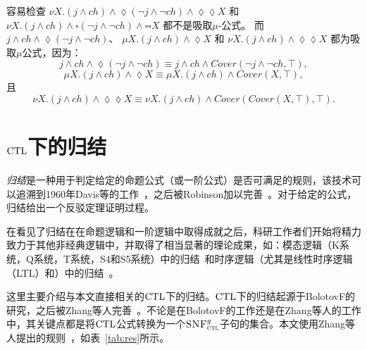 \begin{example}\label{exmp:disF}
	容易检查 $\nu X. (j \wedge ch) \wedge \lozenge (\neg j \wedge \neg ch) \wedge \lozenge \lozenge X$ 和  $\nu X. (j \wedge ch) \wedge \square (\neg j \wedge \neg ch) \wedge \square \square X$ 都不是吸取$\mu$-公式。
	而 $j \wedge ch \wedge \lozenge (\neg j \wedge \neg ch)$、 $\mu X. (j \wedge ch) \wedge \lozenge X$ 和 $\nu X. (j \wedge ch) \wedge \lozenge \lozenge X$ 都为吸取$\mu$公式，因为：
	\[
	j \wedge ch \wedge \lozenge (\neg j \wedge \neg ch) \equiv j \wedge ch \wedge Cover(\neg j \wedge \neg ch, \top),
	\]
	\[
	\mu X. (j \wedge ch) \wedge \lozenge X \equiv  \mu X. (j \wedge ch) \wedge Cover(X, \top),
	\] 且
	\[
	\nu X. (j \wedge ch) \wedge \lozenge \lozenge X \equiv \nu X. (j \wedge ch) \wedge Cover(Cover(X, \top), \top).
	\]
	
\end{example}

\section{$\textrm{CTL}$下的归结}\label{chapter02:CTLres}

\emph{归结}是一种用于判定给定的命题公式（或一阶公式）是否可满足的规则，该技术可以追溯到1960年Davis等的工作~\cite{DBLP:journals/jacm/DavisP60}，之后被Robinson加以完善~\cite{DBLP:journals/jacm/Robinson65}。对于给定的公式，归结给出一个反驳定理证明过程。

在看见了归结在在命题逻辑和一阶逻辑中取得成就之后，科研工作者们开始将精力致力于其他非经典逻辑中，并取得了相当显著的理论成果，如：模态逻辑（K系统，Q系统，T系统，S4和S5系统）中的归结~\cite{DBLP:journals/tcs/EnjalbertC89}和时序逻辑（尤其是线性时序逻辑（LTL）和\CTL）中的归结~\cite{DBLP:conf/cade/CavalliC84,DBLP:journals/jetai/BolotovF99}。

这里主要介绍与本文直接相关的$\textrm{CTL}$下的归结。$\textrm{CTL}$下的归结起源于BolotovF的研究\cite{DBLP:journals/jetai/BolotovF99}，之后被Zhang等人完善~\cite{zhang2014resolution}。不论是在BolotovF的工作还是在Zhang等人的工作中，其关键点都是将$\textrm{CTL}$公式转换为一个${\textsc{SNF}_{\textsc{ctl}}^g}$子句的集合。本文使用Zhang等人提出的规则~\cite{zhang2014resolution}，如表~\ref{tab:res}所示。

